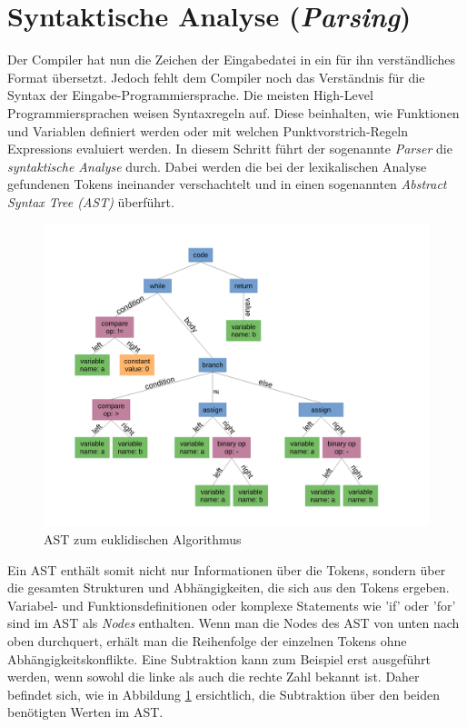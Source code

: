 \section{Syntaktische Analyse (\textit{Parsing})}
Der Compiler hat nun die Zeichen der Eingabedatei in ein für ihn verständliches Format übersetzt.
Jedoch fehlt dem Compiler noch das Verständnis für die Syntax der Eingabe-Programmiersprache.
Die meisten High-Level Programmiersprachen weisen Syntaxregeln auf. Diese beinhalten, wie Funktionen und Variablen definiert werden oder mit welchen Punktvorstrich-Regeln Expressions evaluiert werden.
In diesem Schritt führt der sogenannte \textit{Parser} die \textit{syntaktische Analyse} durch.
Dabei werden die bei der lexikalischen Analyse gefundenen Tokens ineinander verschachtelt und in einen sogenannten \textit{Abstract Syntax Tree (AST)} überführt.

\begin{figure}[H]
    \centering
    \includegraphics[scale=0.4]{resources/images/AST.pdf}
    \caption[AST zum euklidischen Algorithmus. (https://en.wikipedia.org/wiki/Abstract\_syntax\_tree, besucht am 5.8.2024)]{AST zum euklidischen Algorithmus}
    \label{fig:syntax-tree}
\end{figure}

Ein AST enthält somit nicht nur Informationen über die Tokens, sondern über die gesamten Strukturen und Abhängigkeiten, die sich aus den Tokens ergeben. Variabel- und Funktionsdefinitionen oder komplexe Statements wie 'if' oder 'for'
sind im AST als \textit{Nodes} enthalten. Wenn man die Nodes des AST von unten nach oben durchquert, erhält man die Reihenfolge der einzelnen Tokens ohne Abhängigkeitskonflikte.
Eine Subtraktion kann zum Beispiel erst ausgeführt werden, wenn sowohl die linke als auch die rechte Zahl bekannt ist.
Daher befindet sich, wie in Abbildung \ref{fig:syntax-tree} ersichtlich, die Subtraktion über den beiden benötigten Werten im AST.

